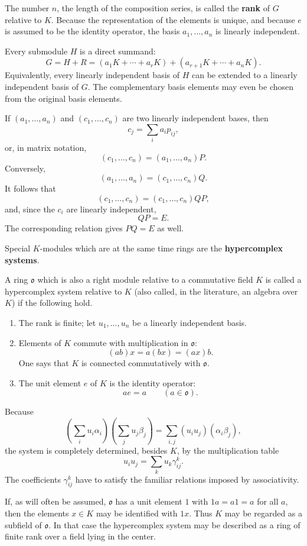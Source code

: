 \documentclass[11pt]{article}
\begin{document}
The number \(n\), the length of the composition series, is called the
\textbf{rank} of \(G\) relative to \(K\). Because the representation of
the elements is unique, and because \(e\) is assumed to be the identity
operator, the basis \(a_1,\ldots,a_n\) is linearly independent.

Every submodule \(H\) is a direct summand: \[
  G=H+R=(a_1K+\cdots+a_rK)+(a_{r+1}K+\cdots+a_nK).
\] Equivalently, every linearly independent basis of \(H\) can be
extended to a linearly independent basis of \(G\). The complementary
basis elements may even be chosen from the original basis elements.

If \((a_1,\ldots,a_n)\) and \((c_1,\ldots,c_n)\) are two linearly
independent bases, then \[
  c_j=\sum_i a_i p_{ij},
\] or, in matrix notation, \[
  (c_1,\ldots,c_n)=(a_1,\ldots,a_n)P.
\] Conversely, \[
  (a_1,\ldots,a_n)=(c_1,\ldots,c_n)Q.
\] It follows that \[
  (c_1,\ldots,c_n)=(c_1,\ldots,c_n)QP,
\] and, since the \(c_i\) are linearly independent, \[
  QP=E.
\] The corresponding relation gives \(PQ=E\) as well.

Special \(K\)-modules which are at the same time rings are the
\textbf{hypercomplex systems}.

A ring \(\mathfrak{o}\) which is also a right module relative to a
commutative field \(K\) is called a hypercomplex system relative to
\(K\) (also called, in the literature, an algebra over \(K\)) if the
following hold.

\begin{enumerate}
\def\labelenumi{\arabic{enumi}.}
\item
  The rank is finite; let \(u_1,\ldots,u_n\) be a linearly independent
  basis.
\item
  Elements of \(K\) commute with multiplication in \(\mathfrak{o}\): \[
    (ab)x=a(bx)=(ax)b.
  \] One says that \(K\) is connected commutatively with
  \(\mathfrak{o}\).
\item
  The unit element \(e\) of \(K\) is the identity operator: \[
    ae=a \qquad (a\in\mathfrak{o}).
  \]
\end{enumerate}

Because \[
  \left(\sum_i u_i\alpha_i\right)
  \left(\sum_j u_j\beta_j\right)
  =\sum_{i,j} (u_i u_j)(\alpha_i\beta_j),
\] the system is completely determined, besides \(K\), by the
multiplication table \[
  u_i u_j=\sum_k u_k\gamma_{ij}^{k}.
\] The coefficients \(\gamma_{ij}^{k}\) have to satisfy the familiar
relations imposed by associativity.

If, as will often be assumed, \(\mathfrak{o}\) has a unit element \(1\)
with \(1a=a1=a\) for all \(a\), then the elements \(x\in K\) may be
identified with \(1x\). Thus \(K\) may be regarded as a subfield of
\(\mathfrak{o}\). In that case the hypercomplex system may be described
as a ring of finite rank over a field lying in the center.
\end{document}

